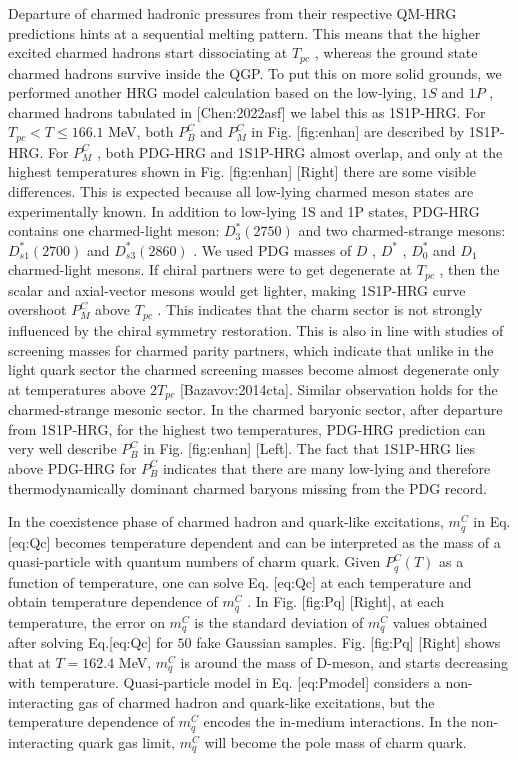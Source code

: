 \documentclass[11pt,a4paper]{article}
\begin{document}
Departure of charmed hadronic pressures from their respective QM-HRG predictions hints at a sequential melting pattern. This means that the higher excited charmed hadrons start dissociating at  $T_{pc}$ , whereas the ground state charmed hadrons survive inside the QGP. To put this on more solid grounds, we performed another HRG model calculation based on the low-lying,  $1S$  and  $1P$ , charmed hadrons tabulated in [Chen:2022asf]  we label this as 1S1P-HRG. For  $T_{pc}<T\leq 166.1$ MeV, both  $P^C_B$  and  $P^C_M$  in Fig. [fig:enhan] are described by 1S1P-HRG. For  $P^C_M$ , both PDG-HRG and 1S1P-HRG almost overlap, and only at the highest temperatures shown in Fig. [fig:enhan] [Right] there are some visible differences. This is expected because all low-lying charmed meson states are experimentally known. In addition to low-lying 1S and 1P states, PDG-HRG contains one charmed-light meson:  $D_3^*(2750)$  and two charmed-strange mesons:  $D_{s1}^*(2700)$  and  $D_{s3}^*(2860)$ . We used PDG masses of  $D$ ,  $D^*$ ,  $D^*_0$  and  $D_1$  charmed-light mesons. If chiral partners were to get degenerate at  $T_{pc}$ , then the scalar and axial-vector mesons would get lighter, making 1S1P-HRG curve overshoot  $P^C_M$  above  $T_{pc}$ . This indicates that the charm sector is not strongly influenced by the chiral symmetry restoration. This is also in line with studies of screening masses for charmed parity partners, which indicate that unlike in the light quark sector the charmed screening masses  become almost degenerate only at temperatures above  $2T_{pc}$  [Bazavov:2014cta]. Similar observation holds for the charmed-strange mesonic sector. In the charmed baryonic sector, after departure from 1S1P-HRG, for the highest two temperatures, PDG-HRG prediction can very well describe  $P^C_B$  in Fig. [fig:enhan] [Left]. The fact that 1S1P-HRG lies above PDG-HRG for  $P^C_B$  indicates that there are many low-lying and therefore thermodynamically dominant charmed baryons missing from the PDG record.

In the coexistence phase of charmed hadron and quark-like excitations,  $m^C_q$  in Eq. [eq:Qc] becomes temperature dependent and can be interpreted as the mass of a quasi-particle with quantum numbers of charm quark. Given  $P^C_q(T)$  as a function of temperature, one can solve Eq. [eq:Qc] at each temperature and obtain temperature dependence of  $m^C_q$ . In Fig. [fig:Pq] [Right], at each temperature, the error on  $m^C_q$  is the standard deviation of  $m^C_q$  values obtained after solving Eq.[eq:Qc] for  $50$  fake Gaussian samples. Fig. [fig:Pq] [Right] shows that at  $T=162.4$  MeV,  $m^C_q$  is around the mass of D-meson, and starts decreasing with temperature. Quasi-particle model in Eq. [eq:Pmodel] considers a non-interacting gas of charmed hadron and quark-like excitations, but the temperature dependence of  $m^C_q$  encodes the in-medium interactions. In the non-interacting quark gas limit,  $m^C_q$  will become the pole mass of charm quark.
\end{document}
